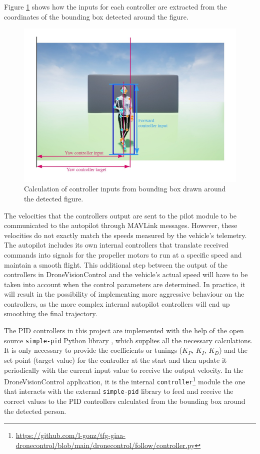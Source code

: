 Figure \ref{fig:follow-input-calcs} shows how the inputs for each controller are extracted from the coordinates of the bounding box detected around the figure.
\begin{figure}[H]
  \centering
  \includegraphics[width=\textwidth, keepaspectratio]{img/pose-calculations.jpg}
  \caption{Calculation of controller inputs from bounding box drawn around the detected figure.}
  \label{fig:follow-input-calcs}
\end{figure}

The velocities that the controllers output are sent to the pilot module to be communicated to the autopilot through MAVLink messages. However, these velocities do not exactly match the speeds measured by the vehicle's telemetry. The autopilot includes its own internal controllers that translate received commands into signals for the propeller motors to run at a specific speed and maintain a smooth flight. This additional step between the output of the controllers in DroneVisionControl and the vehicle's actual speed will have to be taken into account when the control parameters are determined. In practice, it will result in the possibility of implementing more aggressive behaviour on the controllers, as the more complex internal autopilot controllers will end up smoothing the final trajectory.

The PID controllers in this project are implemented with the help of the open source \texttt{simple-pid} Python library \cite{pid-library}, which supplies all the necessary calculations.
It is only necessary to provide the coefficients or tunings ($K_P$, $K_I$, $K_D$) and the set point (target value) for the controller at the start and then update it periodically with the current input value to receive the output velocity.
In the DroneVisionControl application, it is the internal \texttt{controller}\footnote{\url{https://github.com/l-gonz/tfg-giaa-dronecontrol/blob/main/dronecontrol/follow/controller.py}} module the one that interacts with the external \texttt{simple-pid} library to feed and receive the correct values to the PID controllers calculated from the bounding box around the detected person.

